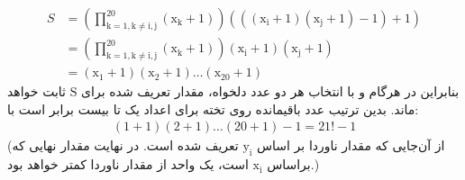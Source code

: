 \documentclass[11pt,largemargins]{h2wp}
\begin{document}
    \begin{align} \nonumber
        S &= \mathrm{(\prod_{k=1,k\neq i,j}^{20} ({x}_k + 1))((({x}_i + 1)({x}_j + 1)-1)+1)} \\ \nonumber
        & = \mathrm{(\prod_{k=1,k\neq i,j}^{20} ({x}_k + 1))({x}_i + 1)({x}_j + 1)}\\ \nonumber
        & =\mathrm{ ({x}_1 + 1)({x}_2 + 1)\ldots({x}_{20} + 1)}    \nonumber 
    \end{align}    
    بنابراین در هرگام و با انتخاب هر دو عدد دلخواه، مقدار تعریف شده برای
    $\mathrm{S}$
    ثابت خواهد ماند. بدین ترتیب عدد باقیمانده روی تخته برای اعداد یک تا بیست برابر است با:
    \begin{align} \nonumber
        \mathrm{(1 + 1)(2 + 1)\ldots(20 + 1) - 1= 21!-1}  \nonumber     
    \end{align}
    (از آن‌جایی که مقدار ناوردا بر اساس 
    $\mathrm{{y}_i}$
    تعریف شده است. در نهایت مقدار نهایی که براساس
    $\mathrm{{x}_i}$
    است، یک واحد از مقدار ناوردا کمتر خواهد بود.)
    \\
\end{document}
